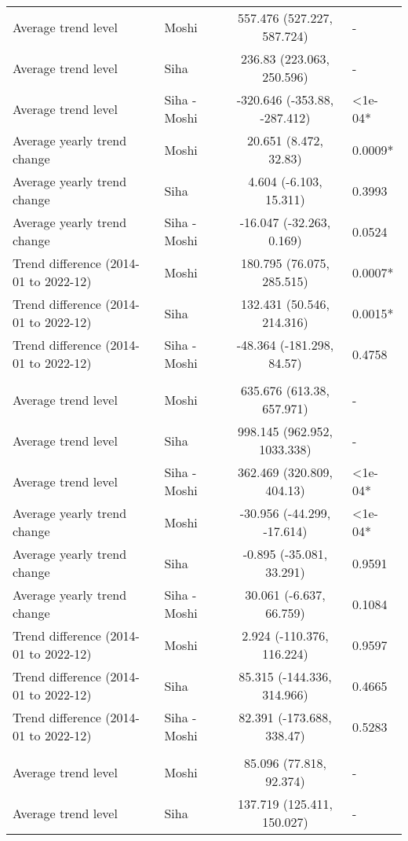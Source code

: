 \begin{longtable}{l|lcl}
\midrule\addlinespace[2.5pt]
Average trend level & Moshi & 557.476 (527.227, 587.724) & - \\ 
Average trend level & Siha & 236.83 (223.063, 250.596) & - \\ 
Average trend level & Siha - Moshi & -320.646 (-353.88, -287.412) & <1e-04* \\ 
Average yearly trend change & Moshi & 20.651 (8.472, 32.83) & 0.0009* \\ 
Average yearly trend change & Siha & 4.604 (-6.103, 15.311) & 0.3993 \\ 
Average yearly trend change & Siha - Moshi & -16.047 (-32.263, 0.169) & 0.0524 \\ 
Trend difference (2014-01 to 2022-12) & Moshi & 180.795 (76.075, 285.515) & 0.0007* \\ 
Trend difference (2014-01 to 2022-12) & Siha & 132.431 (50.546, 214.316) & 0.0015* \\ 
Trend difference (2014-01 to 2022-12) & Siha - Moshi & -48.364 (-181.298, 84.57) & 0.4758 \\ 
\midrule\addlinespace[2.5pt]
\multicolumn{4}{l}{Gastrointestinal Infections} \\ 
\midrule\addlinespace[2.5pt]
Average trend level & Moshi & 635.676 (613.38, 657.971) & - \\ 
Average trend level & Siha & 998.145 (962.952, 1033.338) & - \\ 
Average trend level & Siha - Moshi & 362.469 (320.809, 404.13) & <1e-04* \\ 
Average yearly trend change & Moshi & -30.956 (-44.299, -17.614) & <1e-04* \\ 
Average yearly trend change & Siha & -0.895 (-35.081, 33.291) & 0.9591 \\ 
Average yearly trend change & Siha - Moshi & 30.061 (-6.637, 66.759) & 0.1084 \\ 
Trend difference (2014-01 to 2022-12) & Moshi & 2.924 (-110.376, 116.224) & 0.9597 \\ 
Trend difference (2014-01 to 2022-12) & Siha & 85.315 (-144.336, 314.966) & 0.4665 \\ 
Trend difference (2014-01 to 2022-12) & Siha - Moshi & 82.391 (-173.688, 338.47) & 0.5283 \\ 
\midrule\addlinespace[2.5pt]
\multicolumn{4}{l}{Infectious Eye Disease} \\ 
\midrule\addlinespace[2.5pt]
Average trend level & Moshi & 85.096 (77.818, 92.374) & - \\ 
Average trend level & Siha & 137.719 (125.411, 150.027) & - \\ 

\end{longtable}
